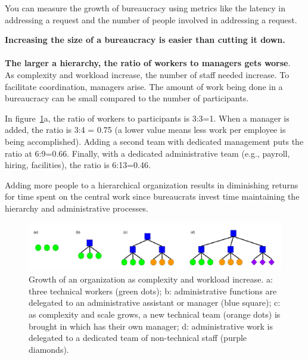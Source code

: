 You can measure the growth of bureaucracy using metrics like the latency in addressing a request and 
the number of people involved in addressing a request.  

\textbf{Increasing the size of a bureaucracy is easier than cutting it down.}\\
\ \\

\textbf{The larger a hierarchy, the ratio of workers to managers gets worse}. \\

As complexity and workload increase, the number of staff needed increase. To facilitate coordination, managers arise. The amount of work being done in a bureaucracy can be small compared to the number of participants.

In figure~\ref{fig:growth_of_bureaucracy}a, the ratio of workers to participants is 3:3=1. When a manager is added, the ratio is 3:4 = 0.75 (a lower value means less work per employee is being accomplished). Adding a second team with dedicated management puts the ratio at 6:9=0.66. Finally, with a dedicated administrative team (e.g., payroll, hiring, facilities), the ratio is 6:13=0.46.

Adding more people to a hierarchical organization results in diminishing returns for time spent on the central work since bureaucrats invest time maintaining the hierarchy and administrative processes.

    \begin{figure}
        \centering
        \includegraphics[width=1\textwidth]{images/growth-of-bureaucracy.pdf}
        \caption{Growth of an organization as complexity and workload increase. a: three technical workers (green dots); b: administrative functions are delegated to an administrative assistant or manager (blue square); c: as complexity and scale grows, a new technical team (orange dots) is brought in which has their own manager; d: administrative work is delegated to a dedicated team of non-technical staff (purple diamonds).}
        \label{fig:growth_of_bureaucracy}
    \end{figure}

\ \\

